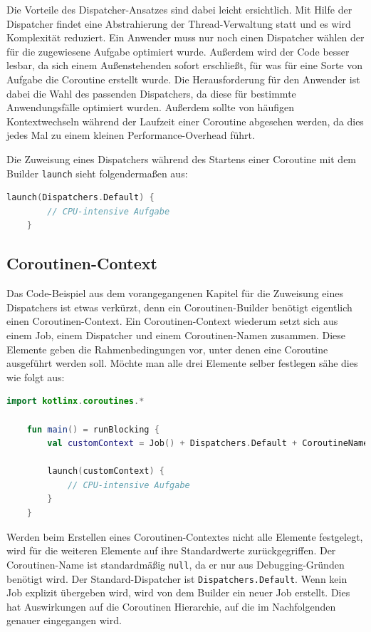 \documentclass[fontsize=12pt,paper=a4,twoside=semi,parskip=half-,headsepline,headinclude]{scrreprt}
\begin{document}
Die Vorteile des Dispatcher-Ansatzes sind dabei leicht ersichtlich. Mit Hilfe der Dispatcher findet eine Abstrahierung der Thread-Verwaltung statt und es wird Komplexität reduziert. Ein Anwender muss nur noch einen Dispatcher wählen der für die zugewiesene Aufgabe optimiert wurde. Außerdem wird der Code besser lesbar, da sich einem Außenstehenden sofort erschließt, für was für eine Sorte von Aufgabe die Coroutine erstellt wurde. Die Herausforderung für den Anwender ist dabei die Wahl des passenden Dispatchers, da diese für bestimmte Anwendungsfälle optimiert wurden. Außerdem sollte von häufigen Kontextwechseln während der Laufzeit einer Coroutine abgesehen werden, da dies jedes Mal zu einem kleinen  Performance-Overhead führt.

Die Zuweisung eines Dispatchers während des Startens einer Coroutine mit dem Builder \texttt{launch} sieht folgendermaßen aus:

\begin{lstlisting}[language=Kotlin]
	launch(Dispatchers.Default) {
		// CPU-intensive Aufgabe
	}
\end{lstlisting}

\subsection{Coroutinen-Context}
\label{subsec:coroutinecontext}

Das Code-Beispiel aus dem vorangegangenen Kapitel für die Zuweisung eines Dispatchers ist etwas verkürzt, denn ein Coroutinen-Builder benötigt eigentlich einen Coroutinen-Context. Ein Coroutinen-Context wiederum setzt sich aus einem Job, einem Dispatcher und einem Coroutinen-Namen zusammen. Diese Elemente geben die Rahmenbedingungen vor, unter denen eine Coroutine ausgeführt werden soll. Möchte man alle drei Elemente selber festlegen sähe dies wie folgt aus:

\begin{lstlisting}[language=Kotlin]
	import kotlinx.coroutines.*

	fun main() = runBlocking {
		val customContext = Job() + Dispatchers.Default + CoroutineName("MyCoroutine")
	
		launch(customContext) {
			// CPU-intensive Aufgabe
		}
	}
\end{lstlisting}

Werden beim Erstellen eines Coroutinen-Contextes nicht alle Elemente festgelegt, wird für die weiteren Elemente auf ihre Standardwerte zurückgegriffen. Der Coroutinen-Name ist standardmäßig \texttt{null}, da er nur aus Debugging-Gründen benötigt wird. Der Standard-Dispatcher ist \texttt{Dispatchers.Default}. Wenn kein Job explizit übergeben wird, wird von dem Builder ein neuer Job erstellt. Dies hat Auswirkungen auf die Coroutinen Hierarchie, auf die im Nachfolgenden genauer eingegangen wird.
\end{document}
